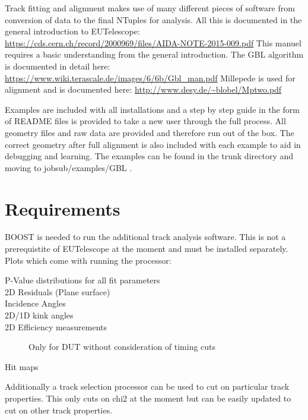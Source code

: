 Track fitting and alignment makes use of many different pieces of software from conversion of data to the final NTuples for analysis. All this is documented in the general introduction to EUTelescope:
\newline
\url{https://cds.cern.ch/record/2000969/files/AIDA-NOTE-2015-009.pdf}
\newline
This manuel requires a basic understanding from the general introduction. The GBL algorithm is documented in detail here:
\newline	
\url{https://www.wiki.terascale.de/images/6/6b/Gbl_man.pdf}
\newline
Millepede is used for alignment and is documented here:
\newline
\url{http://www.desy.de/~blobel/Mptwo.pdf}
\newline


Examples are included with all installations and a step by step guide in the form of README files is provided to take a new user through the full process. All geometry files and raw data are provided and therefore run out of the box. The correct geometry after full alignment is also included with each example to aid in debugging and learning.  The examples can be found in the trunk directory and moving to jobsub/examples/GBL .

\section{Requirements}
BOOST is needed to run the additional track analysis software. This is not a prerequistite of EUTelescope at the moment and must be installed separately. Plots which come with running the processor:

\begin{description} 
\item[P-Value distributions for all fit parameters] 
\item[2D Residuals (Plane surface)] 
\item[Incidence Angles] 
\item[2D/1D kink angles] 
\item[2D Efficiency measurements] Only for DUT without consideration of timing cuts
\item[Hit maps] 
\end{description} 

Additionally a track selection processor can be used to cut on particular track properties. This only cuts on chi2 at the moment but can be easily updated to cut on other track properties. 


